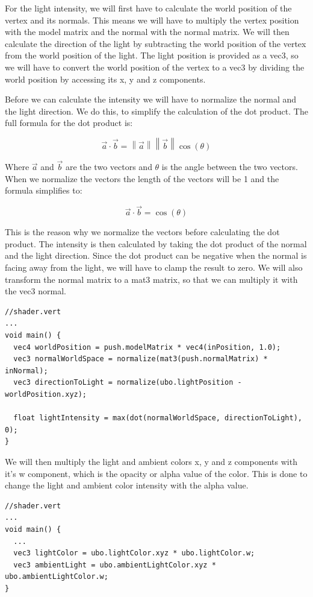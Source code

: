 \documentclass[12pt]{report} \usepackage{preamble}
\begin{document}
For the light intensity, we will first have to calculate the world position of the vertex and its normals.
This means we will have to multiply the vertex position with the model matrix and the normal with the normal matrix.
We will then calculate the direction of the light by subtracting the world position of the vertex from the world position of the light.
The light position is provided as a vec3, so we will have to convert the world position of the vertex to a vec3 by dividing the world position by accessing its x, y and z components.

Before we can calculate the intensity we will have to normalize the normal and the light direction. We do this, to simplify the calculation of the dot product.
The full formula for the dot product is:

\[
	\vec{a} \cdot \vec{b} = \left\| \vec{a} \right\| \left\| \vec{b} \right\| \cos(\theta)
\]

Where $\vec{a}$ and $\vec{b}$ are the two vectors and $\theta$ is the angle between the two vectors.
When we normalize the vectors the length of the vectors will be 1 and the formula simplifies to:

\[
	\vec{a} \cdot \vec{b} = \cos(\theta)
\]

This is the reason why we normalize the vectors before calculating the dot product.
The intensity is then calculated by taking the dot product of the normal and the light direction.
Since the dot product can be negative when the normal is facing away from the light, we will have to clamp the result to zero.
We will also transform the normal matrix to a mat3 matrix, so that we can multiply it with the vec3 normal.

\begin{lstlisting}[Language=C++]
//shader.vert
...
void main() {
  vec4 worldPosition = push.modelMatrix * vec4(inPosition, 1.0);
  vec3 normalWorldSpace = normalize(mat3(push.normalMatrix) * inNormal);
  vec3 directionToLight = normalize(ubo.lightPosition - worldPosition.xyz);

  float lightIntensity = max(dot(normalWorldSpace, directionToLight), 0);
}
\end{lstlisting}

We will then multiply the light and ambient colors x, y and z components with it's w component, which is the
opacity or alpha value of the color. This is done to change the light and ambient color intensity with the alpha value.

\begin{lstlisting}[Language=C++]
//shader.vert
...
void main() {
  ...
  vec3 lightColor = ubo.lightColor.xyz * ubo.lightColor.w;
  vec3 ambientLight = ubo.ambientLightColor.xyz * ubo.ambientLightColor.w;
}
\end{lstlisting}
\end{document}

